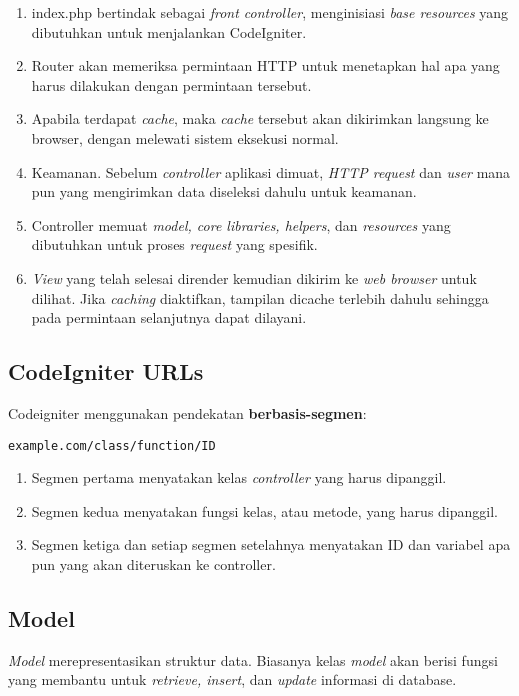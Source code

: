 \begin{enumerate}
\item index.php bertindak sebagai \textit{front controller}, menginisiasi \textit{base resources} yang dibutuhkan untuk menjalankan CodeIgniter.
\item Router akan memeriksa permintaan HTTP untuk menetapkan hal apa yang harus dilakukan dengan permintaan tersebut.
\item Apabila terdapat \textit{cache}, maka \textit{cache} tersebut akan dikirimkan langsung ke browser, dengan melewati sistem eksekusi normal.
\item Keamanan. Sebelum \textit{controller} aplikasi dimuat, \textit{HTTP request} dan \textit{user} mana pun yang mengirimkan data diseleksi dahulu untuk keamanan.
\item Controller memuat \textit{model, core libraries, helpers}, dan \textit{resources} yang dibutuhkan untuk proses \textit{request} yang spesifik.
\item \textit{View} yang telah selesai dirender kemudian dikirim ke \textit{web browser} untuk dilihat. Jika \textit{caching} diaktifkan, tampilan dicache terlebih dahulu sehingga pada permintaan selanjutnya dapat dilayani.\cite{codeigniter:17}
\end{enumerate}

\subsection{CodeIgniter URLs}
\label{subs:urls}
Codeigniter menggunakan pendekatan \textbf{berbasis-segmen}:\cite{codeigniter:17}
\begin{lstlisting}[frame=single] 
example.com/class/function/ID
\end{lstlisting}

\begin{enumerate}
\item Segmen pertama menyatakan kelas \textit{controller} yang harus dipanggil.
\item Segmen kedua menyatakan fungsi kelas, atau metode, yang harus dipanggil.
\item Segmen ketiga dan setiap segmen setelahnya menyatakan ID dan variabel apa pun yang akan diteruskan ke controller.
\end{enumerate}

\subsection{Model}
\label{subs:model}
\textit{Model} merepresentasikan struktur data. Biasanya kelas \textit {model} akan berisi fungsi yang membantu untuk \textit{retrieve, insert}, dan \textit{update} informasi di database.

